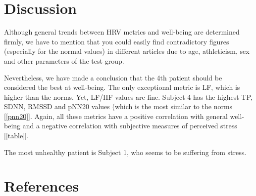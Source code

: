 \documentclass[9pt,twocolumn,twoside,lineno]{gsajnl}
\begin{document}
\section{Discussion}
Although general trends between HRV metrics and well-being are determined firmly, we have to mention that you could easily find contradictory figures (especially for the normal values) in different articles due to age, athleticism, sex and other parameters of the test group.

Nevertheless, we have made a conclusion that the 4th patient should be considered the best at well-being. The only exceptional metric is LF, which is higher than the norms. Yet, LF/HF values are fine. Subject 4 has the highest TP, SDNN, RMSSD and pNN20 values (which is the most similar to the norms [\ref{pnn20}]. Again, all these metrics have a positive correlation with general well-being and a negative correlation with subjective measures of perceived stress [\ref{table}].

The most unhealthy patient is Subject 1, who seems to be suffering from stress.

\section{References}
\end{document}
